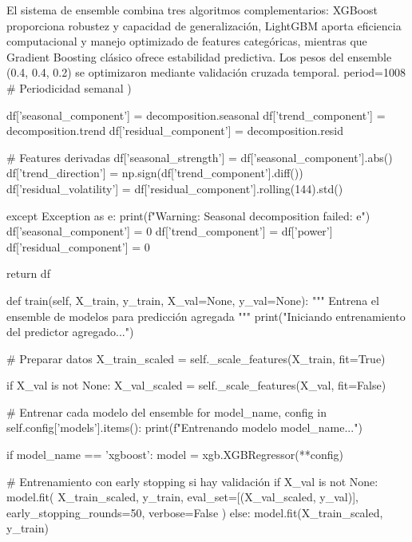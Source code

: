 El sistema de ensemble combina tres algoritmos complementarios: XGBoost proporciona robustez y capacidad de generalización, LightGBM aporta eficiencia computacional y manejo optimizado de features categóricas, mientras que Gradient Boosting clásico ofrece estabilidad predictiva. Los pesos del ensemble (0.4, 0.4, 0.2) se optimizaron mediante validación cruzada temporal.
                    period=1008  # Periodicidad semanal
                )
                
                df['seasonal_component'] = decomposition.seasonal
                df['trend_component'] = decomposition.trend
                df['residual_component'] = decomposition.resid
                
                # Features derivadas
                df['seasonal_strength'] = df['seasonal_component'].abs()
                df['trend_direction'] = np.sign(df['trend_component'].diff())
                df['residual_volatility'] = df['residual_component'].rolling(144).std()
                
            except Exception as e:
                print(f"Warning: Seasonal decomposition failed: {e}")
                df['seasonal_component'] = 0
                df['trend_component'] = df['power']
                df['residual_component'] = 0
        
        return df
    
    def train(self, X_train, y_train, X_val=None, y_val=None):
        """
        Entrena el ensemble de modelos para predicción agregada
        """
        print("Iniciando entrenamiento del predictor agregado...")
        
        # Preparar datos
        X_train_scaled = self._scale_features(X_train, fit=True)
        
        if X_val is not None:
            X_val_scaled = self._scale_features(X_val, fit=False)
        
        # Entrenar cada modelo del ensemble
        for model_name, config in self.config['models'].items():
            print(f"Entrenando modelo {model_name}...")
            
            if model_name == 'xgboost':
                model = xgb.XGBRegressor(**config)
                
                # Entrenamiento con early stopping si hay validación
                if X_val is not None:
                    model.fit(
                        X_train_scaled, y_train,
                        eval_set=[(X_val_scaled, y_val)],
                        early_stopping_rounds=50,
                        verbose=False
                    )
                else:
                    model.fit(X_train_scaled, y_train)
                    
